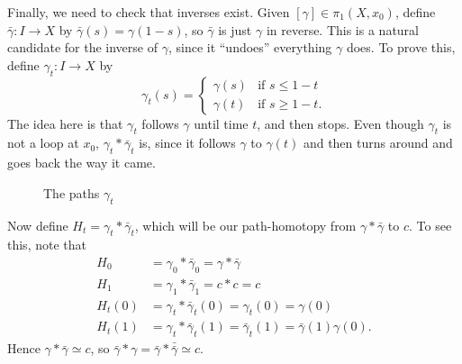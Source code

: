 \documentclass{article}
\theoremstyle{definition}
\theoremstyle{remark}
\numberwithin{figure}{section}
\begin{document}
Finally, we need to check that inverses exist. Given $[\gamma] \in \pi_1(X, x_0)$, define $\bar\gamma : I \to X$ by $\bar\gamma(s) = \gamma(1 - s)$, so $\bar\gamma$ is just $\gamma$ in reverse. This is a natural candidate for the inverse of $\gamma$, since it ``undoes'' everything $\gamma$ does. To prove this, define $\gamma_t : I \to X$ by
\[
\gamma_t(s) = \begin{cases}
	\gamma(s) & \text{if } s \leq 1 - t\\
	\gamma(t) & \text{if } s \geq 1 - t.
\end{cases}
\]
The idea here is that $\gamma_t$ follows $\gamma$ until time $t$, and then stops. Even though $\gamma_t$ is not a loop at $x_0$, $\gamma_t * \bar\gamma_t$ is, since it follows $\gamma$ to $\gamma(t)$ and then turns around and goes back the way it came.

\begin{figure}[h]
	\centering
	\caption{The paths $\gamma_t$}
	\label{fig:inverse visual}
\end{figure}

Now define $H_t = \gamma_t * \bar\gamma_t$, which will be our path-homotopy from $\gamma * \bar\gamma$ to $c$. To see this, note that
\begin{align*}
	H_0 &= \gamma_0 * \bar\gamma_0 = \gamma * \bar\gamma\\
	H_1 &= \gamma_1 * \bar\gamma_1 = c * c = c\\
	H_t(0) &= \gamma_t * \bar\gamma_t(0) = \gamma_t(0) = \gamma(0)\\
	H_t(1) &= \gamma_t * \bar\gamma_t(1) = \bar\gamma_t(1) = \bar\gamma(1) \gamma(0).
\end{align*}
Hence $\gamma * \bar\gamma \simeq c$, so $\bar\gamma * \gamma = \bar\gamma * \bar{\bar\gamma} \simeq c$.
\end{document}

